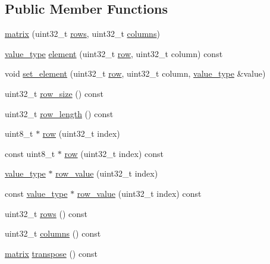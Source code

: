 \subsection*{Public Member Functions}
\begin{DoxyCompactItemize}
\item 
\hyperlink{classkodo_1_1matrix_a205793a47df93dd8aea3633bcedb4e59}{matrix} (uint32\-\_\-t \hyperlink{classkodo_1_1matrix_a18d307fad86b5ca4a98753463174e297}{rows}, uint32\-\_\-t \hyperlink{classkodo_1_1matrix_a94ed0c4f6da851a73181b217d0c1ebe5}{columns})
\item 
\hyperlink{classkodo_1_1matrix_afc02736846855895f1d19bf2d1e96978}{value\-\_\-type} \hyperlink{classkodo_1_1matrix_a59544eb2f7e160e83065f2fdf0f403c6}{element} (uint32\-\_\-t \hyperlink{classkodo_1_1matrix_a25e2a9e5fb5141ec92c5f569f754c715}{row}, uint32\-\_\-t column) const 
\item 
void \hyperlink{classkodo_1_1matrix_a03b69b4182270bd388ba97262fded58a}{set\-\_\-element} (uint32\-\_\-t \hyperlink{classkodo_1_1matrix_a25e2a9e5fb5141ec92c5f569f754c715}{row}, uint32\-\_\-t column, \hyperlink{classkodo_1_1matrix_afc02736846855895f1d19bf2d1e96978}{value\-\_\-type} \&value)
\item 
uint32\-\_\-t \hyperlink{classkodo_1_1matrix_aa8bbd2d38ded9c9ad95529d6e0fa296c}{row\-\_\-size} () const 
\item 
uint32\-\_\-t \hyperlink{classkodo_1_1matrix_a960b6dd8bf0b793027aefda5a5ba04e5}{row\-\_\-length} () const 
\item 
uint8\-\_\-t $\ast$ \hyperlink{classkodo_1_1matrix_a25e2a9e5fb5141ec92c5f569f754c715}{row} (uint32\-\_\-t index)
\item 
const uint8\-\_\-t $\ast$ \hyperlink{classkodo_1_1matrix_a6d2ad34644521b434082b302116cb978}{row} (uint32\-\_\-t index) const 
\begin{DoxyCompactList}\small\item\em \end{DoxyCompactList}\item 
\hyperlink{classkodo_1_1matrix_afc02736846855895f1d19bf2d1e96978}{value\-\_\-type} $\ast$ \hyperlink{classkodo_1_1matrix_ad3e5f4c06cf8d03487e932a186a9d5f8}{row\-\_\-value} (uint32\-\_\-t index)
\item 
const \hyperlink{classkodo_1_1matrix_afc02736846855895f1d19bf2d1e96978}{value\-\_\-type} $\ast$ \hyperlink{classkodo_1_1matrix_a9927c1534fc32cc92c10db3b5c5b0097}{row\-\_\-value} (uint32\-\_\-t index) const 
\begin{DoxyCompactList}\small\item\em \end{DoxyCompactList}\item 
uint32\-\_\-t \hyperlink{classkodo_1_1matrix_a18d307fad86b5ca4a98753463174e297}{rows} () const 
\item 
uint32\-\_\-t \hyperlink{classkodo_1_1matrix_a94ed0c4f6da851a73181b217d0c1ebe5}{columns} () const 
\item 
\hyperlink{classkodo_1_1matrix}{matrix} \hyperlink{classkodo_1_1matrix_a9895924cda47cc4b5a9da38ef2ceb4ad}{transpose} () const 
\end{DoxyCompactItemize}


